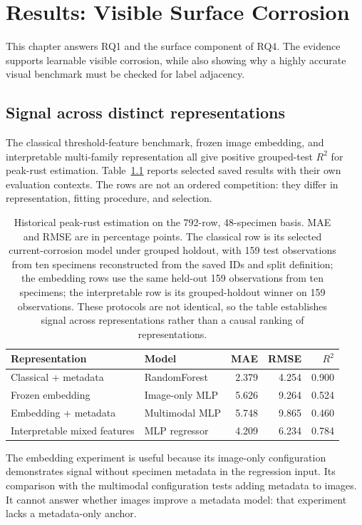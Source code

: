\chapter{Results: Visible Surface Corrosion}\label{ch:surface}
This chapter answers RQ1 and the surface component of RQ4. The evidence supports learnable visible corrosion, while also showing why a highly accurate visual benchmark must be checked for label adjacency.

\section{Signal across distinct representations}
The classical threshold-feature benchmark, frozen image embedding, and interpretable multi-family representation all give positive grouped-test $R^2$ for peak-rust estimation. Table~\ref{tab:surfacehistory} reports selected saved results with their own evaluation contexts. The rows are not an ordered competition: they differ in representation, fitting procedure, and selection.
\begin{table}[htbp]\centering\small
\caption[Historical peak-rust results and protocol scope]{Historical peak-rust estimation on the 792-row, 48-specimen basis. MAE and RMSE are in percentage points. The classical row is its selected current-corrosion model under grouped holdout, with 159 test observations from ten specimens reconstructed from the saved IDs and split definition; the embedding rows use the same held-out 159 observations from ten specimens; the interpretable row is its grouped-holdout winner on 159 observations. These protocols are not identical, so the table establishes signal across representations rather than a causal ranking of representations.}\label{tab:surfacehistory}
\begin{tabular}{llrrr}\toprule
Representation & Model & MAE & RMSE & $R^2$\\\midrule
Classical + metadata & RandomForest & 2.379 & 4.254 & 0.900\\
Frozen embedding & Image-only MLP & 5.626 & 9.264 & 0.524\\
Embedding + metadata & Multimodal MLP & 5.748 & 9.865 & 0.460\\
Interpretable mixed features & MLP regressor & 4.209 & 6.234 & 0.784\\\bottomrule
\end{tabular}
\end{table}
The embedding experiment is useful because its image-only configuration demonstrates signal without specimen metadata in the regression input. Its comparison with the multimodal configuration tests adding metadata to images. It cannot answer whether images improve a metadata model: that experiment lacks a metadata-only anchor.

